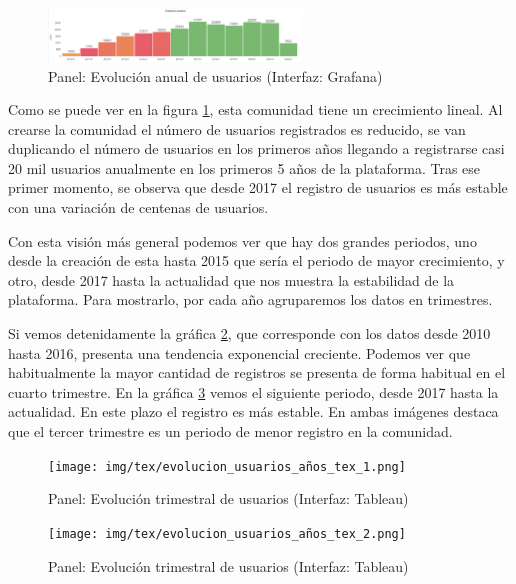 \documentclass[a4paper, 12pt]{book}
\begin{document}
\begin{figure}[ht]
    \centering
    \includegraphics[width=0.6\textwidth]{img/tex/evolucion_usuarios_tex.png}
    \caption{Panel: Evolución anual de usuarios (Interfaz: Grafana)}
    \label{figura:evo_users_tex}
\end{figure}

Como se puede ver en la figura \ref{figura:evo_users_tex}, esta comunidad tiene un crecimiento lineal. Al crearse la comunidad el número de usuarios registrados es reducido, se van duplicando el número de usuarios en los primeros años llegando a registrarse casi 20 mil usuarios anualmente en los primeros 5 años de la plataforma. Tras ese primer momento, se observa que desde 2017 el registro de usuarios es más estable con una variación de centenas de usuarios.

Con esta visión más general podemos ver que hay dos grandes periodos, uno desde la creación de esta hasta 2015 que sería el periodo de mayor crecimiento, y otro, desde 2017 hasta la actualidad que nos muestra la estabilidad de la plataforma. Para mostrarlo, por cada año agruparemos los datos en trimestres. 

Si vemos detenidamente la gráfica \ref{figura:evo_users_trim_tex}, que corresponde con los datos desde 2010 hasta 2016, presenta una tendencia exponencial creciente. Podemos ver que habitualmente la mayor cantidad de registros se presenta de forma habitual en el cuarto trimestre. En la gráfica \ref{figura:evo_users_trim_tex_2} vemos el siguiente periodo, desde 2017 hasta la actualidad. En este plazo el registro es más estable. En ambas imágenes destaca que el tercer trimestre es un periodo de menor registro en la comunidad. 

\begin{figure}[ht]
    \centering
    \texttt{[image: img/tex/evolucion\_usuarios\_años\_tex\_1.png]}
    \caption{Panel: Evolución trimestral de usuarios (Interfaz: Tableau)}
    \label{figura:evo_users_trim_tex}
\end{figure}

\begin{figure}[ht]
    \centering
    \texttt{[image: img/tex/evolucion\_usuarios\_años\_tex\_2.png]}
    \caption{Panel: Evolución trimestral de usuarios (Interfaz: Tableau)}
    \label{figura:evo_users_trim_tex_2}
\end{figure}
\end{document}
